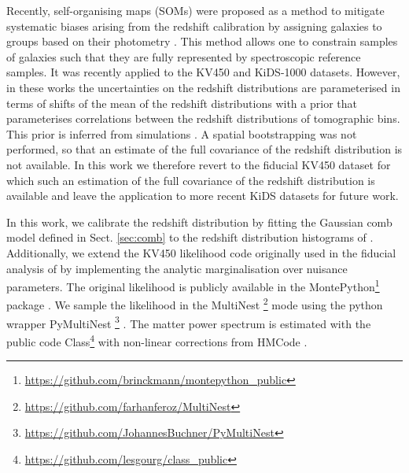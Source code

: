 \documentclass{aa}
\begin{document}
Recently, self-organising maps (SOMs) were proposed as a method to mitigate systematic biases arising from the redshift calibration by assigning galaxies to groups based on their photometry \citep{buchs, wright_som, masters15}. This method allows one to constrain samples of galaxies such that they are fully represented by spectroscopic reference samples. It was recently applied to the KV450 \citep{wright_som_kv450} and KiDS-1000 \citep{hildebrandt20, asgari20} datasets. However, in these works the uncertainties on the redshift distributions are parameterised in terms of shifts of the mean of the redshift distributions with a prior that parameterises correlations between the redshift distributions of tomographic bins. This prior is inferred from simulations \citep{wright_som, hildebrandt20, vdBusch20}. A spatial bootstrapping was not performed, so that an estimate of the full covariance of the redshift distribution is not available. In this work we therefore revert to the fiducial KV450 dataset for which such an estimation of the full covariance of the redshift distribution is available and leave the application to more recent KiDS datasets for future work.

In this work, we calibrate the redshift distribution by fitting the Gaussian comb model defined in Sect. \ref{sec:comb} to the redshift distribution histograms of \cite{hildebrandt18}. Additionally, we extend the KV450 likelihood code originally used in the fiducial analysis of \cite{hildebrandt18} by implementing the analytic marginalisation over nuisance parameters. The original likelihood is publicly available in the {\sc MontePython}\footnote{\url{https://github.com/brinckmann/montepython_public}} package \citep{Audren:2012wb, Brinckmann:2018cvx}. We sample the likelihood in the {\sc MultiNest} \footnote{\url{https://github.com/farhanferoz/MultiNest}} mode \citep{feroz09,feroz19} using the python wrapper {\sc PyMultiNest} \footnote{\url{https://github.com/JohannesBuchner/PyMultiNest}} \citep{buchner14}. The matter power spectrum is estimated with the public code {\sc Class}\footnote{\url{https://github.com/lesgourg/class_public}}\citep{blas11} with non-linear corrections from {\sc HMCode} \citep{mead15}. 
\end{document}
